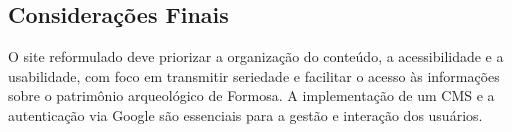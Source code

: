 \subsection*{Considerações Finais}  
O site reformulado deve priorizar a organização do conteúdo, a acessibilidade e a usabilidade, com foco em transmitir seriedade e facilitar o acesso às informações sobre o patrimônio arqueológico de Formosa. A implementação de um CMS e a autenticação via Google são essenciais para a gestão e interação dos usuários.
